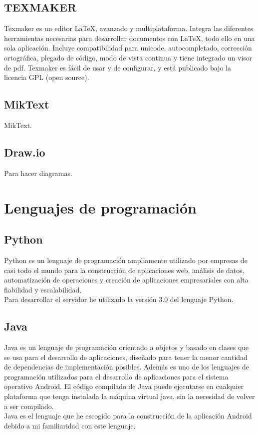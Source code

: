 \subsection{TEXMAKER}

Texmaker es un editor \LaTeX, avanzado y multiplataforma. 
Integra las diferentes herramientas necesarias para desarrollar documentos con \LaTeX, todo ello en una sola aplicación.
Incluye compatibilidad para unicode, autocompletado, corrección ortográfica, plegado de código, modo de vista continua y tiene integrado un visor de pdf.
Texmaker es fácil de usar y de configurar, y está publicado bajo la licencia GPL (open source).

\subsection{MikText}

MikText.

\subsection{Draw.io}

Para hacer diagramas.

\section{Lenguajes de programación}

\subsection{Python}

Python es un lenguaje de programación ampliamente utilizado por empresas de casi todo el mundo para la construcción de aplicaciones web, análisis de datos, automatización de operaciones y creación de aplicaciones empresariales con alta fiabilidad y escalabilidad.\\
Para desarrollar el servidor he utilizado la versión 3.0 del lenguaje Python.

\subsection{Java}

Java es un lenguaje de programación orientado a objetos y basado en clases que se usa para el desarrollo de aplicaciones, diseñado para tener la menor cantidad de dependencias de implementación posibles. Además es uno de los lenguajes de programación utilizados para el desarrollo de aplicaciones para el sistema operativo Android. El código compilado de Java puede ejecutarse en cualquier plataforma que tenga instalada la máquina virtual java, sin la necesidad de volver a ser compilado.\\
Java es el lenguaje que he escogido para la construcción de la aplicación Android debido a mi familiaridad con este lenguaje.

